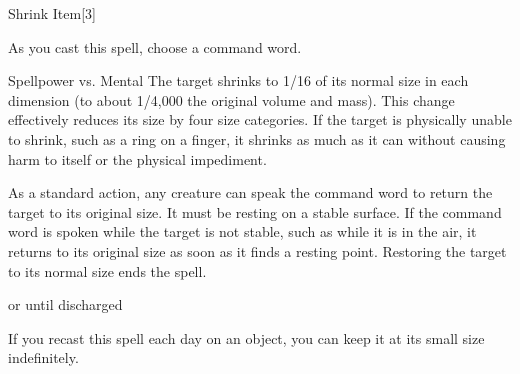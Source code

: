 \begin{spellsection}{Shrink Item}[3]
    \begin{spellheader}
    \end{spellheader}
    \begin{spellcontent}
        \begin{spelltargetinginfo}
        \end{spelltargetinginfo}
        \begin{spelleffects}
            \spellspecial As you cast this spell, choose a command word.
            \begin{spellattack}{Spellpower vs. Mental}
                \spellsuccess The target shrinks to 1/16 of its normal size in each dimension (to about 1/4,000 the original volume and mass). This change effectively reduces its size by four size categories. If the target is physically unable to shrink, such as a ring on a finger, it shrinks as much as it can without causing harm to itself or the physical impediment.

                As a standard action, any creature can speak the command word to return the target to its original size. It must be resting on a stable surface. If the command word is spoken while the target is not stable, such as while it is in the air, it returns to its original size as soon as it finds a resting point. Restoring the target to its normal size ends the spell.
            \end{spellattack}
            \spelldur \durext or until discharged
        \end{spelleffects}
    \end{spellcontent}
    \begin{spellfooter}
        \spellnotes  If you recast this spell each day on an object, you can keep it at its small size indefinitely.
        \miscastrandom
    \end{spellfooter}
    \begin{spellaugments}
    \end{spellaugments}
\end{spellsection}

